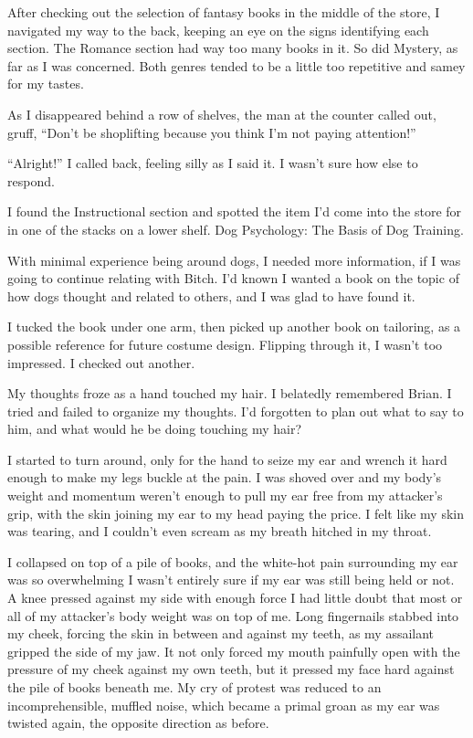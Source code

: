 After checking out the selection of fantasy books in the middle of the store, I navigated my way to the back, keeping an eye on the signs identifying each section.  The Romance section had way too many books in it.  So did Mystery, as far as I was concerned.  Both genres tended to be a little too repetitive and samey for my tastes.



As I disappeared behind a row of shelves, the man at the counter called out, gruff, ``Don't be shoplifting because you think I'm not paying attention!''



``Alright!'' I called back, feeling silly as I said it.  I wasn't sure how else to respond.



I found the Instructional section and spotted the item I'd come into the store for in one of the stacks on a lower shelf.  Dog Psychology: The Basis of Dog Training.



With minimal experience being around dogs, I needed more information, if I was going to continue relating with Bitch.  I'd known I wanted a book on the topic of how dogs thought and related to others, and I was glad to have found it.



I tucked the book under one arm, then picked up another book on tailoring, as a possible reference for future costume design.  Flipping through it, I wasn't too impressed.  I checked out another.



My thoughts froze as a hand touched my hair.  I belatedly remembered Brian.  I tried and failed to organize my thoughts.  I'd forgotten to plan out what to say to him, and what would he be doing touching my hair?



I started to turn around, only for the hand to seize my ear and wrench it hard enough to make my legs buckle at the pain.  I was shoved over and my body's weight and momentum weren't enough to pull my ear free from my attacker's grip, with the skin joining my ear to my head paying the price.  I felt like my skin was tearing, and I couldn't even scream as my breath hitched in my throat.



I collapsed on top of a pile of books, and the white-hot pain surrounding my ear was so overwhelming I wasn't entirely sure if my ear was still being held or not.  A knee pressed against my side with enough force I had little doubt that most or all of my attacker's body weight was on top of me.  Long fingernails stabbed into my cheek, forcing the skin in between and against my teeth, as my assailant gripped the side of my jaw.  It not only forced my mouth painfully open with the pressure of my cheek against my own teeth, but it pressed my face hard against the pile of books beneath me.   My cry of protest was reduced to an incomprehensible, muffled noise, which became a primal groan as my ear was twisted again, the opposite direction as before.



